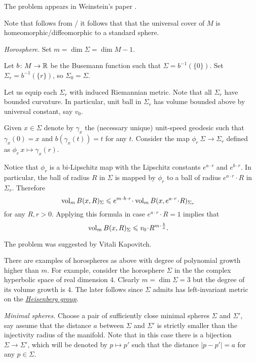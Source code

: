 The problem appears in Weinstein's paper \cite{weinstein}.

Note that follows from \cite{micallef-moore}/\cite{boehm-wilking} it follows that
that the universal cover of $M$ is homeomorphic/diffeomorphic to a standard sphere.



\textit{Horosphere.}
Set 
$m=\dim \Sigma=\dim M-1$.

Let $b\colon M\to\mathbb{R}$ be the Busemann function such that $\Sigma=b^{-1}(\{0\})$.
Set  $\Sigma_r=b^{-1}(\{r\})$, so $\Sigma_0=\Sigma$.

Let us equip each $\Sigma_r$ with induced Riemannian metric.
Note that all $\Sigma_r$ have bounded curvature.
In particular, unit ball in $\Sigma_r$ has volume bounded above by universal constant, say $v_0$.
 

Given $x\in \Sigma$ denote by $\gamma_x$ 
the (necessary unique) unit-speed geodesic
such that $\gamma_x(0)=x$ and $b(\gamma_x(t))=t$ for any $t$.
Consider the map $\phi_{r}\:\Sigma\to\Sigma_r$ defined as
$\phi_r\:x\mapsto \gamma_x(r)$.

Notice that $\phi_r$ is a bi-Lipschitz map with the Lipschitz constants $e^{a\cdot r}$ and $e^{b\cdot r}$.
In particular, the ball of radius $R$ in $\Sigma$ is mapped by $\phi_r$
to a ball of radius $e^{a\cdot r}\cdot R$ in $\Sigma_r$.
Therefore
\[\vol_m B(x,R)_\Sigma\le e^{m\cdot b\cdot r}\cdot \vol_m B(x,e^{a\cdot r}\cdot R)_{\Sigma_r}\]
for any $R,r>0$.
Applying this formula in case $e^{a\cdot r}\cdot R=1$ implies that
\[\vol_m B(x,R)_\Sigma\le v_0\cdot R^{m\cdot \frac ba}.\]

The problem was suggested by Vitali Kapovitch.

There are examples of horospheres as above with degree of polynomial growth higher than $m$.
For example, consider the horosphere $\Sigma$ in the
the complex hyperbolic space 
of real dimension $4$.
Clearly $m=\dim \Sigma=3$ but the degree of its volume growth is $4$.
The later follows since $\Sigma$ admits has left-invariant metric on the \hyperref[Heisenberg group]{\emph{Heisenberg group}}.


                                                      



\textit{Minimal spheres.}
Choose a pair of sufficiently close minimal spheres $\Sigma$ and $\Sigma'$,
say assume that the distance $a$ between $\Sigma$ and $\Sigma'$ is strictly smaller than the injectivity radius of the manifold.
Note that in this case there is a bijection $\Sigma\to \Sigma'$, which will be denoted by $p\mapsto p'$ such that the distance $|p-p'|=a$ for any $p\in\Sigma$.

